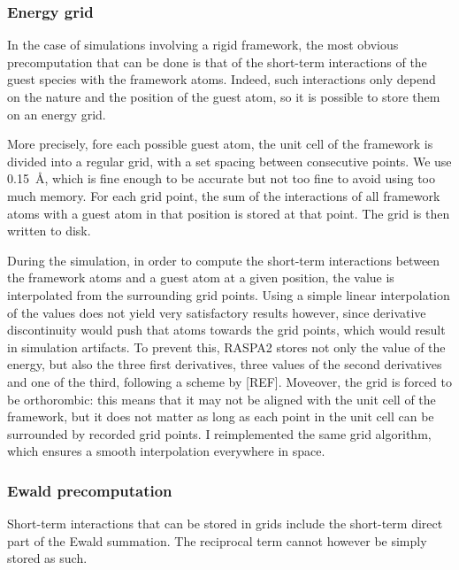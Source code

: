 \documentclass[main.tex]{subfiles}
\begin{document}
\subsubsection{Energy grid}

\label{energygrid}

In the case of simulations involving a rigid framework, the most obvious precomputation that can be done is that of the short-term interactions of the guest species with the framework atoms. Indeed, such interactions only depend on the nature and the position of the guest atom, so it is possible to store them on an energy grid.

More precisely, fore each possible guest atom, the unit cell of the framework is divided into a regular grid, with a set spacing between consecutive points. We use \qty{0.15}{\angstrom}, which is fine enough to be accurate but not too fine to avoid using too much memory. For each grid point, the sum of the interactions of all framework atoms with a guest atom in that position is stored at that point. The grid is then written to disk.

During the simulation, in order to compute the short-term interactions between the framework atoms and a guest atom at a given position, the value is interpolated from the surrounding grid points. Using a simple linear interpolation of the values does not yield very satisfactory results however, since derivative discontinuity would push that atoms towards the grid points, which would result in simulation artifacts. To prevent this, RASPA2 stores not only the value of the energy, but also the three first derivatives, three values of the second derivatives and one of the third, following a scheme by [REF]. Moveover, the grid is forced to be orthorombic: this means that it may not be aligned with the unit cell of the framework, but it does not matter as long as each point in the unit cell can be surrounded by recorded grid points. I reimplemented the same grid algorithm, which ensures a smooth interpolation everywhere in space.

\subsubsection{Ewald precomputation}

Short-term interactions that can be stored in grids include the short-term direct part of the Ewald summation. The reciprocal term cannot however be simply stored as such.
\end{document}
